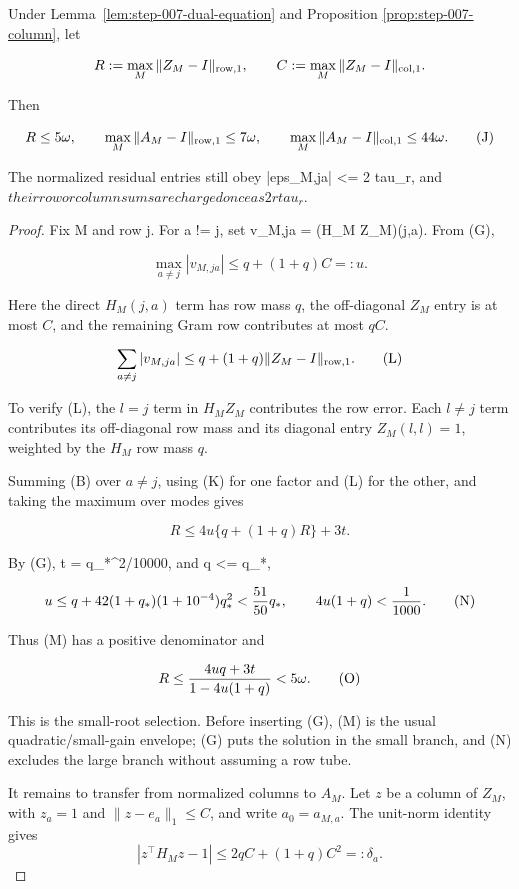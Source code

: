 \begin{proposition}\label{prop:step-007-row}

Under Lemma~\ref{lem:step-007-dual-equation} and Proposition
\ref{prop:step-007-column}, let

\[
R:=\max_M\|Z_M-I\|_{\rm row,1},\qquad
C:=\max_M\|Z_M-I\|_{\rm col,1}.
\]

Then

\[
R\le5\omega,\qquad
\max_M\|A_M-I\|_{\rm row,1}\le7\omega,\qquad
\max_M\|A_M-I\|_{\rm col,1}\le44\omega.
\tag{J}
\]

The normalized residual entries still obey |eps\_M,ja| <= 2 tau\_r, and
$their row or column sums are charged once as 2 r tau_r.$

\begin{proof}

Fix M and row j.  For a != j, set v\_M,ja = (H\_M Z\_M)(j,a).  From (G),

\[
\max_{a\ne j}|v_{M,ja}|\le q+(1+q)C=:u.
\tag{K}
\]

Here the direct $H_M(j,a)$ term has row mass $q$, the off-diagonal $Z_M$
entry is at most $C$, and the remaining Gram row contributes at most $qC$.

\[
\sum_{a\ne j}|v_{M,ja}|
\le q+(1+q)\|Z_M-I\|_{\rm row,1}.
\tag{L}
\]

To verify (L), the $l=j$ term in $H_MZ_M$ contributes the row error. Each
$l\ne j$ term contributes its off-diagonal row mass and its diagonal entry
$Z_M(l,l)=1$, weighted by the $H_M$ row mass $q$.

Summing (B) over $a\ne j$, using (K) for one factor and (L) for the other,
and taking the maximum over modes gives

\[
R\le4u\{q+(1+q)R\}+3t.
\tag{M}
\]

By (G), t = q\_*^2/10000, and q <= q\_*,

\[
u\le q+42(1+q_*)(1+10^{-4})q_*^2<{51\over50}q_*,\qquad
4u(1+q)<{1\over1000}.
\tag{N}
\]

Thus (M) has a positive denominator and

\[
R\le{4uq+3t\over1-4u(1+q)}<5\omega.
\tag{O}
\]

This is the small-root selection.  Before inserting (G), (M) is the usual
quadratic/small-gain envelope; (G) puts the solution in the small branch,
and (N) excludes the large branch without assuming a row tube.

It remains to transfer from normalized columns to $A_M$. Let $z$ be a column
of $Z_M$, with $z_a=1$ and $\|z-e_a\|_1\le C$, and write $a_0=a_{M,a}$.
The unit-norm identity gives
\[
|z^\top H_Mz-1|\le2qC+(1+q)C^2=:\delta_a.
\tag{P}
\]


\end{proof}
\end{proposition}
